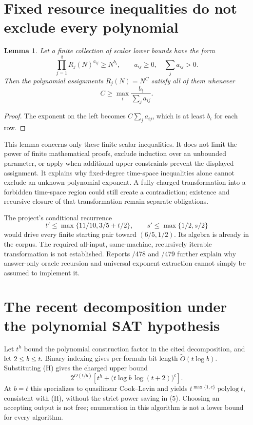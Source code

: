 \documentclass[11pt]{article}
\newtheorem{lemma}{Lemma}
\newcommand{\polylog}{\operatorname{polylog}}
\begin{document}
\section{Fixed resource inequalities do not exclude every polynomial}
\begin{lemma}
Let a finite collection of scalar lower bounds have the form
\[
 \prod_{j=1}^{q}R_j(N)^{a_{ij}}\ge N^{b_i},
 \qquad a_{ij}\ge0,\quad \sum_j a_{ij}>0.
\]
Then the polynomial assignments $R_j(N)=N^C$ satisfy all of them whenever
\[
 C\ge\max_i\frac{b_i}{\sum_j a_{ij}}.
\]
\end{lemma}
\begin{proof}
The exponent on the left becomes $C\sum_j a_{ij}$, which is at least $b_i$
for each row.
\end{proof}

This lemma concerns only these finite scalar inequalities. It does not
limit the power of finite mathematical proofs, exclude induction over an
unbounded parameter, or apply when additional upper constraints prevent
the displayed assignment. It explains why fixed-degree time-space
inequalities alone cannot exclude an unknown polynomial exponent.
A fully charged transformation into a forbidden time-space region could
still create a contradiction; existence and recursive closure of that
transformation remain separate obligations.

The project's conditional recurrence
\[
 t'\le\max\{11/10,3/5+t/2\},\qquad
 s'\le\max\{1/2,s/2\}
\]
would drive every finite starting pair toward $(6/5,1/2)$. Its algebra is
already in the corpus. The required all-input, same-machine, recursively
iterable transformation is not established. Reports /478 and /479 further
explain why answer-only oracle recursion and universal exponent extraction
cannot simply be assumed to implement it.

\section{The recent decomposition under the polynomial SAT hypothesis}
Let $t^h$ bound the polynomial construction factor in the cited
decomposition, and let $2\le b\le t$. Binary indexing gives per-formula bit
length $\widetilde O(t\log b)$. Substituting (H) gives the charged upper bound
\[
 2^{O(t/b)}
 \left[t^h+\bigl(t\log b\,\log(t+2)\bigr)^c\right].
 \tag{6}
\]
At $b=t$ this specializes to quasilinear Cook--Levin and yields
$t^{\max\{1,c\}}\polylog t$, consistent with (H), without the strict
power saving in (5). Choosing an accepting output is not free;
enumeration in this algorithm is not a lower bound for every algorithm.
\end{document}
